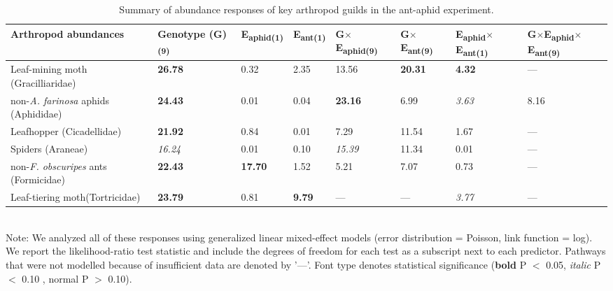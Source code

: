 \documentclass[11pt]{article}
\begin{document}
\begin{table}
\centering
\caption{Summary of abundance responses of key arthropod
guilds in the ant-aphid experiment.}
\label{aaGuild}
\begin{tabular}{@{}llllllll@{}}
\toprule
Arthropod abundances               & Genotype (G)\textsubscript{(9)} & E\textsubscript{aphid(1)} & E\textsubscript{ant(1)} & G$\times$E\textsubscript{aphid(9)} & G$\times$E\textsubscript{ant(9)} & E\textsubscript{aphid}$\times$E\textsubscript{ant(1)} & G$\times$E\textsubscript{aphid}$\times$E\textsubscript{ant(9)} \\
\midrule
Leaf-mining moth (Gracilliaridae)   & \textbf{26.78}           & 0.32      & 2.35    & 13.56       & \textbf{20.31}     & \textbf{4.32}           & ---                \\
non-\textit{A. farinosa} aphids (Aphididae)  & \textbf{24.43}           & 0.01      & 0.04    & \textbf{23.16}       & 6.99      & \textit{3.63}           & 8.16             \\
Leafhopper (Cicadellidae)           & \textbf{21.92}           & 0.84      & 0.01    & 7.29        & 11.54     & 1.67           & ---                \\
Spiders (Araneae)                   & \textit{16.24}           & 0.01      & 0.10     & \textit{15.39}       & 11.34     & 0.01           & ---                \\
non-\textit{F. obscuripes} ants (Formicidae) & \textbf{22.43}           & \textbf{17.70}      & 1.52    & 5.21        & 7.07      & 0.73           & ---                \\
Leaf-tiering moth(Tortricidae)     & \textbf{23.79}           & 0.81      & \textbf{9.79}    & ---           & ---         & \textit{3.77}           &    --- \\
\bottomrule
\end{tabular}
\bigskip{}
\\
{\footnotesize Note: We analyzed all of these responses
using generalized linear mixed-effect models (error distribution = Poisson, link function = log). We report the likelihood-ratio test statistic and include the degrees of freedom for each test as a subscript next to each predictor. Pathways that were not modelled because of insufficient data are denoted by '---'. Font type denotes statistical significance (\textbf{bold} P $<$ 0.05, \textit{italic} P $<$ 0.10 , normal P $>$ 0.10).}
\end{table}
\end{document}
